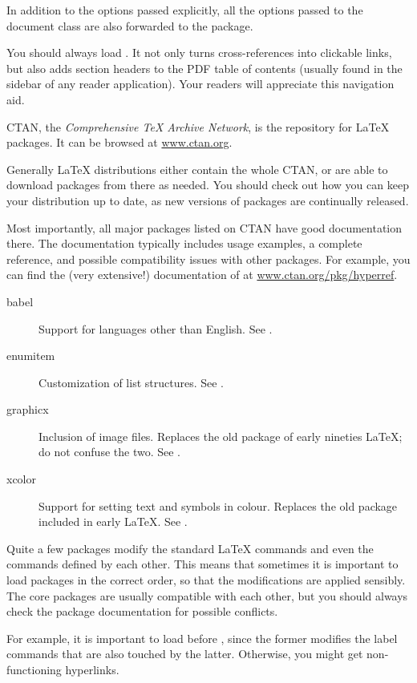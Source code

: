 In addition to the options passed explicitly,
all the options passed to the document class are also forwarded to the package.

\begin{practices}
You should always load .
It not only turns cross-references into clickable links,
but also adds section headers to the PDF table of contents
(usually found in the sidebar of any reader application).
Your readers will appreciate this navigation aid.
\end{practices}

CTAN, the \emph{Comprehensive \TeX{} Archive Network},
is the repository for \LaTeX{} packages.
It can be browsed at \url{www.ctan.org}.

Generally \LaTeX{} distributions either contain the whole CTAN,
or are able to download packages from there as needed.
You should check out how you can keep your distribution up to date,
as new versions of packages are continually released.

Most importantly, all major packages listed on CTAN have good documentation there.
The documentation typically includes usage examples, a complete reference,
and possible compatibility issues with other packages.
For example, you can find the (very extensive!) documentation of 
at \url{www.ctan.org/pkg/hyperref}.

\begin{description}
\item[babel] Support for languages other than English.
    See .
\item[enumitem] Customization of list structures.
    See .
\item[graphicx] Inclusion of image files.
    Replaces the old  package of early nineties \LaTeX{};
    do not confuse the two.
    See .
\item[xcolor] Support for setting text and symbols in colour.
    Replaces the old  package included in early \LaTeX{}.
    See .
\end{description}


\begin{gotcha}
Quite a few packages modify the standard \LaTeX{} commands
and even the commands defined by each other.
This means that sometimes it is important to load packages in the correct order,
so that the modifications are applied sensibly.
The core packages are usually compatible with each other,
but you should always check the package documentation for possible conflicts.

For example, it is important to load  before ,
since the former modifies the label commands that are also touched by the latter.
Otherwise, you might get non-functioning hyperlinks.
\end{gotcha}



